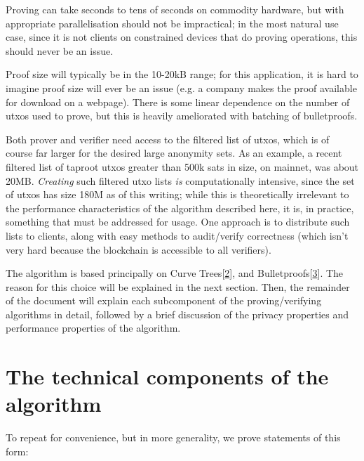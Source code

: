 \documentclass[10pt,a4paper]{article}
\begin{document}
\vspace{5 pt}

Proving can take seconds to tens of seconds on commodity hardware, but with appropriate parallelisation should not be impractical; in the most natural use case, since it is not clients on constrained devices that do proving operations, this should never be an issue.

\vspace{5 pt}

Proof size will typically be in the 10-20kB range; for this application, it is hard to imagine proof size will ever be an issue (e.g. a company makes the proof available for download on a webpage). There is some linear dependence on the number of utxos used to prove, but this is heavily ameliorated with batching of bulletproofs.

\vspace{5 pt}

Both prover and verifier need access to the filtered list of utxos, which is of course far larger for the desired large anonymity sets. As an example, a recent filtered list of taproot utxos greater than 500k sats in size, on mainnet, was about 20MB. \emph{Creating} such filtered utxo lists \emph{is} computationally intensive, since the set of utxos has size 180M as of this writing; while this is theoretically irrelevant to the performance characteristics of the algorithm described here, it is, in practice, something that must be addressed for usage. One approach is to distribute such lists to clients, along with easy methods to audit/verify correctness (which isn't very hard because the blockchain is accessible to all verifiers).

\vspace{5 pt}

The algorithm is based principally on Curve Trees{[}\protect\hyperlink{anchor-2}{2}{]}, and Bulletproofs{[}\protect\hyperlink{anchor-3}{3}{]}. The reason for this choice will be explained in the next section. Then, the remainder of the document will explain each subcomponent of the proving/verifying algorithms in detail, followed by a brief discussion of the privacy properties and performance properties of the algorithm.

\section{The technical components of the algorithm}

To repeat for convenience, but in more generality, we prove statements of this form:
\end{document}
